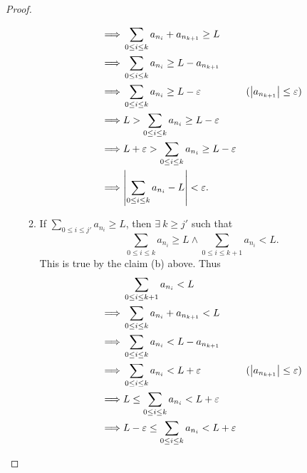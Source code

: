 \begin{proof}
\begin{enumerate}
\begin{enumerate}[label=(\Roman*)]
\begin{align*}
                            \implies & \sum_{0 \leq i \leq k} a_{n_i} + a_{n_{k + 1}} \geq L                                                           \\
                            \implies & \sum_{0 \leq i \leq k} a_{n_i} \geq L - a_{n_{k + 1}}                                                           \\
                            \implies & \sum_{0 \leq i \leq k} a_{n_i} \geq L - \varepsilon                   & (\abs*{a_{n_{k + 1}}} \leq \varepsilon) \\
                            \implies & L > \sum_{0 \leq i \leq k} a_{n_i} \geq L - \varepsilon                                                         \\
                            \implies & L + \varepsilon > \sum_{0 \leq i \leq k} a_{n_i} \geq L - \varepsilon                                           \\
                            \implies & \abs*{\sum_{0 \leq i \leq k} a_{n_i} - L} < \varepsilon.
                        \end{align*}
                  \item If \(\sum_{0 \leq i \leq j'} a_{n_i} \geq L\), then \(\exists\ k \geq j'\) such that
                        \[
                            \sum_{0 \leq i \leq k} a_{n_i} \geq L \land \sum_{0 \leq i \leq k + 1} a_{n_i} < L.
                        \]
                        This is true by the claim (b) above.
                        Thus
                        \begin{align*}
                                     & \sum_{0 \leq i \leq k + 1} a_{n_i} < L                                                                          \\
                            \implies & \sum_{0 \leq i \leq k} a_{n_i} + a_{n_{k + 1}} < L                                                              \\
                            \implies & \sum_{0 \leq i \leq k} a_{n_i} < L - a_{n_{k + 1}}                                                              \\
                            \implies & \sum_{0 \leq i \leq k} a_{n_i} < L + \varepsilon                      & (\abs*{a_{n_{k + 1}}} \leq \varepsilon) \\
                            \implies & L \leq \sum_{0 \leq i \leq k} a_{n_i} < L + \varepsilon                                                         \\
                            \implies & L - \varepsilon \leq \sum_{0 \leq i \leq k} a_{n_i} < L + \varepsilon                                           \\

\end{align*}
\end{enumerate}
\end{enumerate}
\end{proof}
